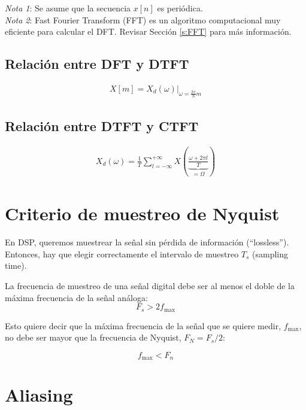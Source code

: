 \emph{Nota 1}: Se asume que la secuencia $x[n]$ es periódica.\\

\emph{Nota 2}: Fast Fourier Transform (FFT) es un algoritmo computacional muy eficiente para calcular el DFT. Revisar Sección \ref{s:FFT} para más información.\\

\subsection{Relación entre DFT y DTFT}

\begin{align*}
    X[m]=X_d(\omega)\bigg|_{\omega=\frac{2\pi}{N}m}
\end{align*}

\subsection{Relación entre DTFT y CTFT}

\begin{align*}
    X_d(\omega) = \frac{1}{T} \sum_{l=-\infty}^{+\infty} X \left( \underbrace{\frac{\omega + 2\pi l}{T}}_{= \Omega} \right)
\end{align*}

\section{Criterio de muestreo de Nyquist}

En DSP, queremos muestrear la señal sin pérdida de información (``lossless''). Entonces, hay que elegir correctamente el intervalo de muestreo $T_s$ (sampling time).\\

\begin{theorem}
    La frecuencia de muestreo de una señal digital debe ser al menos el doble de la máxima frecuencia de la señal análoga:
    $$F_s > 2 f_{\max}$$
\end{theorem}

Esto quiere decir que la máxima frecuencia de la señal que se quiere medir, $f_{\max}$, no debe ser mayor que la frecuencia de Nyquist, $F_N = F_s/2$:

$$ f_{\max} < F_n $$

\section{Aliasing}

